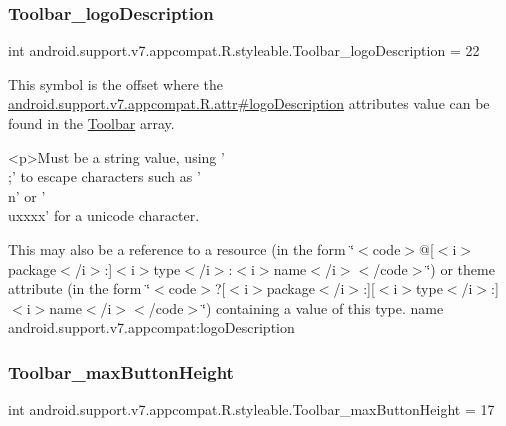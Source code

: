 \subsubsection{\texorpdfstring{Toolbar\+\_\+logo\+Description}{Toolbar\_logoDescription}}
{\footnotesize\ttfamily int android.\+support.\+v7.\+appcompat.\+R.\+styleable.\+Toolbar\+\_\+logo\+Description = 22\hspace{0.3cm}{\ttfamily [static]}}

This symbol is the offset where the \hyperlink{classandroid_1_1support_1_1v7_1_1appcompat_1_1R_1_1attr_aa0fd67233c5627d649c4a1f72cd41be8}{android.\+support.\+v7.\+appcompat.\+R.\+attr\#logo\+Description} attribute\textquotesingle{}s value can be found in the \hyperlink{classandroid_1_1support_1_1v7_1_1appcompat_1_1R_1_1styleable_a2daba9587ef9f700f2d54cf13435cb32}{Toolbar} array.

\begin{DoxyVerb}      <p>Must be a string value, using '\\;' to escape characters such as '\\n' or '\\uxxxx' for a unicode character.
\end{DoxyVerb}
 

This may also be a reference to a resource (in the form \char`\"{}$<$code$>$@\mbox{[}$<$i$>$package$<$/i$>$\+:\mbox{]}$<$i$>$type$<$/i$>$\+:$<$i$>$name$<$/i$>$$<$/code$>$\char`\"{}) or theme attribute (in the form \char`\"{}$<$code$>$?\mbox{[}$<$i$>$package$<$/i$>$\+:\mbox{]}\mbox{[}$<$i$>$type$<$/i$>$\+:\mbox{]}$<$i$>$name$<$/i$>$$<$/code$>$\char`\"{}) containing a value of this type.  name android.\+support.\+v7.\+appcompat\+:logo\+Description \mbox{\label{classandroid_1_1support_1_1v7_1_1appcompat_1_1R_1_1styleable_ae47cf713bfead553edda363c784fd33b}} 
\subsubsection{\texorpdfstring{Toolbar\+\_\+max\+Button\+Height}{Toolbar\_maxButtonHeight}}
{\footnotesize\ttfamily int android.\+support.\+v7.\+appcompat.\+R.\+styleable.\+Toolbar\+\_\+max\+Button\+Height = 17\hspace{0.3cm}{\ttfamily [static]}}

